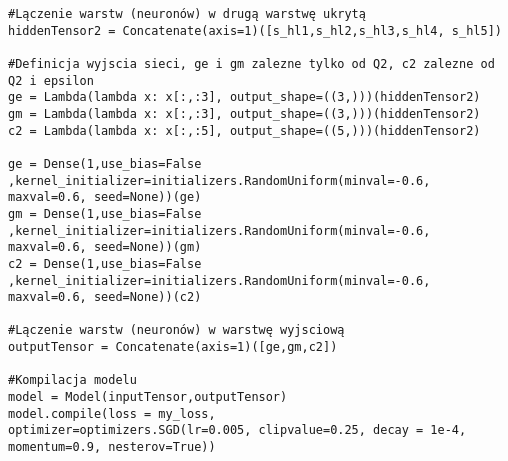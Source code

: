 \documentclass[11pt]{book}
\theoremstyle{definition}
\begin{document}
\begin{lstlisting}
#Lączenie warstw (neuronów) w drugą warstwę ukrytą
hiddenTensor2 = Concatenate(axis=1)([s_hl1,s_hl2,s_hl3,s_hl4, s_hl5])

#Definicja wyjscia sieci, ge i gm zalezne tylko od Q2, c2 zalezne od Q2 i epsilon
ge = Lambda(lambda x: x[:,:3], output_shape=((3,)))(hiddenTensor2)
gm = Lambda(lambda x: x[:,:3], output_shape=((3,)))(hiddenTensor2)
c2 = Lambda(lambda x: x[:,:5], output_shape=((5,)))(hiddenTensor2)

ge = Dense(1,use_bias=False
,kernel_initializer=initializers.RandomUniform(minval=-0.6, maxval=0.6, seed=None))(ge)
gm = Dense(1,use_bias=False
,kernel_initializer=initializers.RandomUniform(minval=-0.6, maxval=0.6, seed=None))(gm)
c2 = Dense(1,use_bias=False
,kernel_initializer=initializers.RandomUniform(minval=-0.6, maxval=0.6, seed=None))(c2)   

#Lączenie warstw (neuronów) w warstwę wyjsciową
outputTensor = Concatenate(axis=1)([ge,gm,c2])

#Kompilacja modelu
model = Model(inputTensor,outputTensor)
model.compile(loss = my_loss,
optimizer=optimizers.SGD(lr=0.005, clipvalue=0.25, decay = 1e-4, momentum=0.9, nesterov=True)) 
\end{lstlisting}
\end{document}
